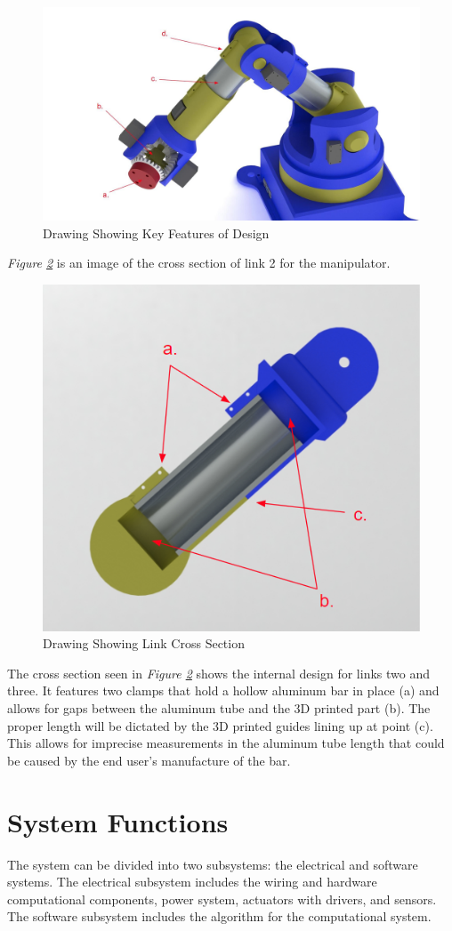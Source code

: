 \documentclass[12pt]{report}
\begin{document}
\begin{figure}[htp]
  \centering
  \includegraphics[frame,width=.75\textwidth]{link_callouts}
  \caption{Drawing Showing Key Features of Design}
  \label{fig:link1}
\end{figure}
\emph{Figure \ref{fig:link2}} is an image of the cross section of link 2 for the manipulator.
\begin{figure}[htp]
  \centering
  \includegraphics[frame,width=.45\textwidth]{link_cross_section}
  \caption{Drawing Showing Link Cross Section}
  \label{fig:link2}
\end{figure}
\newpage
The cross section seen in \emph{Figure \ref{fig:link2}} shows the internal design for links two and three. It features two clamps that hold a hollow aluminum bar in place (a) and allows for gaps between the aluminum tube and the 3D printed part (b). The proper length will be dictated by the 3D printed guides lining up at point (c). This allows for imprecise measurements in the aluminum tube length that could be caused by the end user’s manufacture of the bar.

\section{System Functions}
The system can be divided into two subsystems: the electrical and software systems. The electrical subsystem includes the wiring and hardware computational components, power system, actuators with drivers, and sensors. The software subsystem includes the algorithm for the computational system.
\end{document}
